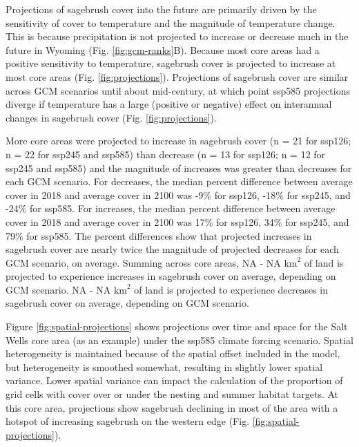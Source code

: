\documentclass[
  12pt,
]{article}
\begin{document}
Projections of sagebrush cover into the future are primarily driven by the sensitivity of cover to temperature and the magnitude of temperature change.
This is because precipitation is not projected to increase or decrease much in the future in Wyoming (Fig. \ref{fig:gcm-ranks}B).
Because most core areas had a positive sensitivity to temperature, sagebrush cover is projected to increase at most core areas (Fig. \ref{fig:projections}).
Projections of sagebrush cover are similar across GCM scenarios until about mid-century, at which point ssp585 projections diverge if temperature has a large (positive or negative) effect on interannual changes in sagebrush cover (Fig. \ref{fig:projections}).

More core areas were projected to increase in sagebrush cover (n = 21 for ssp126; n = 22 for ssp245 and ssp585) than decrease (n = 13 for ssp126; n = 12 for ssp245 and ssp585) and the magnitude of increases was greater than decreases for each GCM scenario.
For decreases, the median percent difference between average cover in 2018 and average cover in 2100 was -9\% for ssp126, -18\% for ssp245, and -24\% for ssp585.
For increases, the median percent difference between average cover in 2018 and average cover in 2100 was 17\% for ssp126, 34\% for ssp245, and 79\% for ssp585.
The percent differences show that projected increases in sagebrush cover are nearly twice the magnitude of projected decreases for each GCM scenario, on average.
Summing across core areas, NA - NA \(\text{km}^2\) of land is projected to experience increases in sagebrush cover on average, depending on GCM scenario.
NA - NA \(\text{km}^2\) of land is projected to experience decreases in sagebrush cover on average, depending on GCM scenario.

Figure \ref{fig:spatial-projections} shows projections over time and space for the Salt Wells core area (as an example) under the ssp585 climate forcing scenario.
Spatial heterogeneity is maintained because of the spatial offset included in the model, but heterogeneity is smoothed somewhat, resulting in slightly lower spatial variance.
Lower spatial variance can impact the calculation of the proportion of grid cells with cover over or under the nesting and summer habitat targets.
At this core area, projections show sagebrush declining in most of the area with a hotspot of increasing sagebrush on the western edge (Fig. \ref{fig:spatial-projections}).
\end{document}
